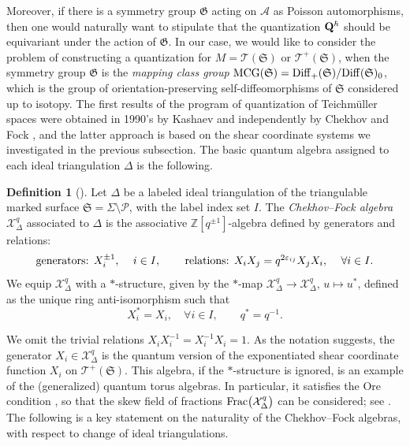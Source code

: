 \documentclass[pdftex]{sigma}
\numberwithin{equation}{section}
\theoremstyle{definition}
\newtheorem{Definition}[Theorem]{Definition}
\begin{document}
Moreover, if there is a symmetry group $\mathfrak{G}$ acting on $\mathcal{A}$ as Poisson automorphisms, then one would naturally want to stipulate that the quantization ${\bf Q}^\hbar$ should be equivariant under the action of $\mathfrak{G}$. In our case, we would like to consider the problem of constructing a quantization for $M = \mathscr{T}(\mathfrak{S})$ or $\mathscr{T}^+(\mathfrak{S})$, when the symmetry group $\mathfrak{G}$ is the {\em mapping class group} ${\rm MCG}(\mathfrak{S}) = {\rm Diff}_+(\mathfrak{S}) / {\rm Diff}(\mathfrak{S})_0$, which is the group of orientation-preserving self-diffeomorphisms of $\mathfrak{S}$ considered up to isotopy.
The first results of the program of quantization of Teichm\"uller spaces were obtained in 1990's by Kashaev \cite{Kash98} and independently by Chekhov and Fock \cite{F97, CF}, and the latter approach is based on the shear coordinate systems we investigated in the previous subsection. The basic quantum algebra assigned to each ideal triangulation $\Delta$ is the following.
\begin{Definition}[\cite{BL07,Liu}]
Let $\Delta$ be a labeled ideal triangulation of the triangulable marked surface $\mathfrak{S} = \Sigma \setminus \mathcal{P}$, with the label index set $I$. The {\em Chekhov--Fock algebra} $\mathcal{X}^q_\Delta$ associated to $\Delta$ is the associative $\mathbb{Z}[q^{\pm 1}]$-algebra defined by generators and relations:
\[
\mbox{generators: $X_i^{\pm 1}$, \quad $i \in I$, \qquad relations: $X_i X_j = q^{2\varepsilon_{ij}} X_j X_i$, \quad $\forall i \in I$}.
\]
We equip $\mathcal{X}^q_\Delta$ with a $*$-structure, given by the $*$-map $\mathcal{X}^q_\Delta \to \mathcal{X}^q_\Delta$, $u \mapsto u^*$, defined as the unique ring anti-isomorphism such that
\[
X_i^* = X_i, \quad \forall i \in I, \qquad q^* = q^{-1}.
\]
\end{Definition}
We omit the trivial relations $X_i X_i^{-1} = X_i^{-1} X_i=1$. As the notation suggests, the generator $X_i \in \mathcal{X}^q_\Delta$ is the quantum version of the exponentiated shear coordinate function $X_i$ on $\mathscr{T}^+(\mathfrak{S})$. This algebra, if the $*$-structure is ignored, is an example of the (generalized) quantum torus algebras. In particular, it satisfies the Ore condition \cite{Cohn}, so that the skew field of fractions ${\rm Frac}\bigl(\mathcal{X}^q_\Delta\bigr)$ can be considered; see \cite{BL07, KLS, Liu}.
The following is a key statement on the naturality of the Chekhov--Fock algebras, with respect to change of ideal triangulations.
\end{document}
